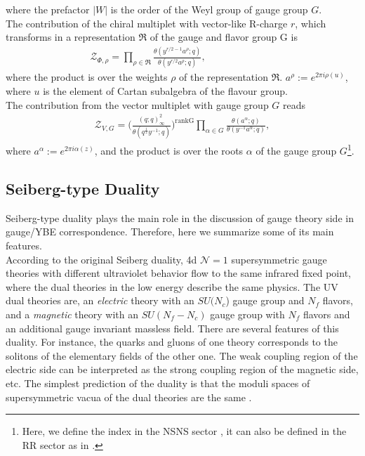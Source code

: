 \documentclass[a4paper,11pt]{article}%
\numberwithin{equation}{section}
\begin{document}
where the prefactor $|W|$ is the order of the Weyl group of gauge group $G$.\\ The contribution of the chiral multiplet with vector-like R-charge $r$, which transforms
in a representation $\mathfrak{R}$ of the gauge and flavor group G is
\begin{align}\label{Chiral}
  \mathcal{Z}_{\Phi,\rho}=\prod_{\rho\in \mathfrak{R} }\frac{\theta(y^{r/2-1}a^{\rho};q) }{\theta(y^{r/2}a^{\rho};q)},\qquad \qquad\qquad\quad
\end{align}
where the product is over the weights $\rho$ of the representation $\mathfrak{R}$. $a^{\rho}:=e^{2\pi i \rho(u)}$, where $u$ is the element of Cartan subalgebra of the flavour group.\\ The contribution from the vector multiplet  with gauge group $G$ reads
\begin{align}\label{Vec}
  \mathcal{Z}_{V,G}=\Big(\frac{(q;q)^2_{\infty}}{\theta(q^{\frac12}y^{-1};q)}\Big)^{\text{rankG}}\prod_{\alpha \in G } \frac{\theta(a^{\alpha};q)}{\theta(y^{-1}a^{\alpha};q)},
\end{align}
where $a^{\alpha}:= e^{2\pi i \alpha(z)}$, and the product is over the roots $\alpha$ of the gauge group  $G$\footnote{Here, we define the index in the NSNS sector \cite{Gadde:2013ftv}, it can also be defined in the RR sector as in \cite{Benini:2013nda,Benini:2013xpa}.}.





\subsection{Seiberg-type Duality} \label{duality}

  Seiberg-type duality plays the main role in the discussion of gauge theory side in gauge/YBE correspondence. Therefore, here we summarize some of its main features.\\According to the original Seiberg  duality, 4d $\mathcal{N}=1$ supersymmetric gauge theories with different ultraviolet behavior flow to the same infrared fixed point, where the dual theories in the low energy  describe the same physics.  The UV dual theories are, an \emph{electric} theory with an $SU(N_c$) gauge group and $N_f$ flavors, and a \emph{magnetic} theory with an $SU(N_f-N_c)$ gauge group with $N_f$ flavors and an additional gauge invariant massless field. There are several features of this duality.  For instance, the quarks and gluons of one theory corresponds to the solitons of the elementary fields of the other one.
The weak coupling region of the electric side can be interpreted as the strong coupling region of the magnetic side, etc.  The simplest prediction of the duality is that the moduli spaces of supersymmetric vacua of the dual theories are the same \cite{Seiberg:1994pq,Hori:2006dk,Yamazaki:2013fva}.
\end{document}
